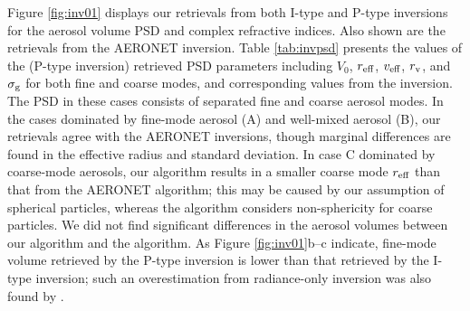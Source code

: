 Figure \ref{fig:inv01} displays our retrievals from both I-type and P-type 
inversions for the aerosol volume PSD and complex refractive indices. 
Also shown are the retrievals from the AERONET \Dub inversion. 
Table \ref{tab:invpsd} presents the values of the (P-type inversion) retrieved
PSD parameters including $V_0$, $r_\text{eff}$, $v_\text{eff}$, $r_\text{v}$, and $\sigma_\text{g}$ for both 
fine and coarse modes, and corresponding values from the \Dub inversion. 
The PSD in these cases consists of separated fine and coarse aerosol modes. 
In the cases dominated by fine-mode aerosol (A) and
well-mixed aerosol (B), our retrievals agree with the AERONET inversions,
though marginal differences are found in the effective radius and standard
deviation. In case C dominated by coarse-mode aerosols, our algorithm results
in a smaller coarse mode $r_\text{eff}$ than that from the AERONET algorithm; this may
be caused by our assumption of spherical particles, whereas the \Dub
algorithm considers non-sphericity for coarse particles. We did not find
significant differences in the aerosol volumes between our algorithm and the
\Dub algorithm. As Figure \ref{fig:inv01}b--c indicate, fine-mode volume 
retrieved by the P-type inversion is lower than that retrieved by the 
I-type inversion; such an overestimation from radiance-only inversion was 
also found by \citet{Li09}.

